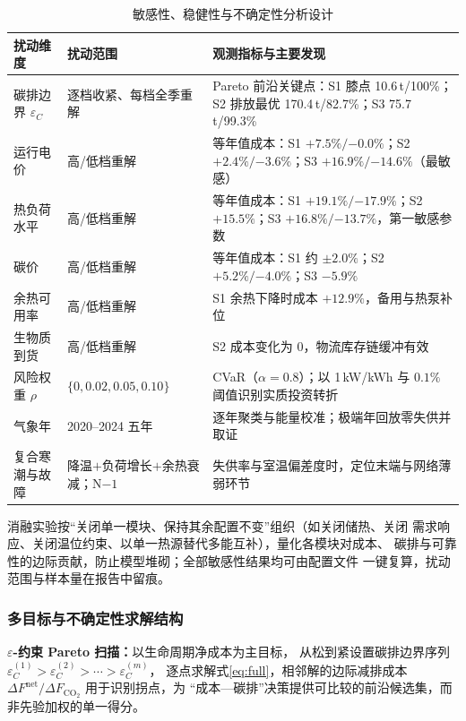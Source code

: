 \begin{table}[H]
  \centering
  \caption{敏感性、稳健性与不确定性分析设计}
  \label{tab:sens}
  \footnotesize
  \begin{tabularx}{\textwidth}{llX}
    \toprule
    扰动维度 & 扰动范围 & 观测指标与主要发现 \\
    \midrule
    碳排边界 $\varepsilon_C$ & 逐档收紧、每档全季重解 & Pareto 前沿关键点：S1 膝点 10.6\,t/100\%；S2 排放最优 170.4\,t/82.7\%；S3 75.7\,t/99.3\% \\
    运行电价 & 高/低档重解 & 等年值成本：S1 $+7.5\%/{-0.0}\%$；S2 $+2.4\%/{-3.6}\%$；S3 $+16.9\%/{-14.6}\%$（最敏感） \\
    热负荷水平 & 高/低档重解 & 等年值成本：S1 $+19.1\%/{-17.9}\%$；S2 $+15.5\%$；S3 $+16.8\%/{-13.7}\%$，第一敏感参数 \\
    碳价 & 高/低档重解 & 等年值成本：S1 约 $\pm2.0\%$；S2 $+5.2\%/{-4.0}\%$；S3 $-5.9\%$ \\
    余热可用率 & 高/低档重解 & S1 余热下降时成本 $+12.9\%$，备用与热泵补位 \\
    生物质到货 & 高/低档重解 & S2 成本变化为 0，物流库存链缓冲有效 \\
    风险权重 $\rho$ & $\{0,0.02,0.05,0.10\}$ & CVaR（$\alpha=0.8$）；以 1\,kW/kWh 与 $0.1\%$ 阈值识别实质投资转折 \\
    气象年 & 2020--2024 五年 & 逐年聚类与能量校准；极端年回放零失供并取证 \\
    复合寒潮与故障 & 降温$+$负荷增长$+$余热衰减；N$-1$ & 失供率与室温偏差度时，定位末端与网络薄弱环节 \\
    \bottomrule
  \end{tabularx}
\end{table}

消融实验按“关闭单一模块、保持其余配置不变”组织（如关闭储热、关闭
需求响应、关闭温位约束、以单一热源替代多能互补），量化各模块对成本、
碳排与可靠性的边际贡献，防止模型堆砌；全部敏感性结果均可由配置文件
一键复算，扰动范围与样本量在报告中留痕。

\subsubsection{多目标与不确定性求解结构}

\textbf{$\varepsilon$-约束 Pareto 扫描：}以生命周期净成本为主目标，
从松到紧设置碳排边界序列
$\varepsilon_C^{(1)}>\varepsilon_C^{(2)}>\cdots>\varepsilon_C^{(m)}$，
逐点求解式\eqref{eq:full}，相邻解的边际减排成本
$\Delta F^{\mathrm{net}}/\Delta F_{\mathrm{CO_2}}$ 用于识别拐点，为
“成本—碳排”决策提供可比较的前沿候选集，而非先验加权的单一得分。

